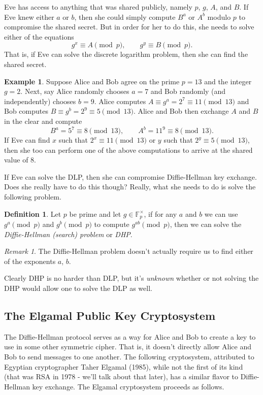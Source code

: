 \documentclass[12pt]{article}
\theoremstyle{plain}
\theoremstyle{definition}
\newtheorem{definition}[theorem]{Definition}
\newtheorem{example}[theorem]{Example}
\theoremstyle{remark}
\newtheorem{remark}[theorem]{Remark}
\newcommand{\F}{\mathbb{F}}
\begin{document}
Eve has access to anything that was shared publicly, namely $p$, $g$, $A$, and $B$.
If Eve knew either $a$ or $b$, then she could simply compute $B^a$ or $A^b$ modulo $p$ to compromise the shared secret.
But in order for her to do this, she needs to solve either of the equations
\[
    g^x \equiv A\pmod p,\qquad g^y\equiv B\pmod p.
\]
That is, if Eve can solve the discrete logarithm problem, then she can find the shared secret.

\begin{example}
    Suppose Alice and Bob agree on the prime $p=13$ and the integer $g = 2$.
    Next, say Alice randomly chooses $a=7$ and Bob randomly (and independently) chooses $b = 9$.
    Alice computes $A\equiv g^a = 2^7 \equiv 11\pmod{13}$ and Bob computes $B\equiv g^b = 2^9 \equiv 5\pmod {13}$.
    Alice and Bob then exchange $A$ and $B$ in the clear and compute
    \[
        B^a = 5^7\equiv 8\pmod {13},\qquad A^b = 11^9\equiv 8\pmod {13}.
    \]
    If Eve can find $x$ such that $2^x\equiv 11\pmod {13}$ or $y$ such that $2^y\equiv 5\pmod{13}$, then she too can perform one of the above computations to arrive at the shared value of 8.
\end{example}

If Eve can solve the DLP, then she can compromise Diffie-Hellman key exchange.
Does she really have to do this though?
Really, what she needs to do is solve the following problem.

\begin{definition}
    Let $p$ be prime and let $g\in \F_p^\times$, if for any $a$ and $b$ we can use $g^a\pmod p$ and $g^b\pmod p$ to compute $g^{ab}\pmod p$, then we can solve the \emph{Diffie-Hellman (search) problem} or \emph{DHP}.
\end{definition}

\begin{remark}
    The Diffie-Hellman problem doesn't actually require us to find either of the exponents $a$, $b$.
\end{remark}
Clearly DHP is no harder than DLP, but it's \emph{unknown} whether or not solving the DHP would allow one to solve the DLP as well.










\subsection{The Elgamal Public Key Cryptosystem}
The Diffie-Hellman protocol serves as a way for Alice and Bob to create a key to use in some other symmetric cipher.
That is, it doesn't directly allow Alice and Bob to send messages to one another.
The following cryptosystem, attributed to Egyptian cryptographer Taher Elgamal (1985), while not the first of its kind (that was RSA in 1978 - we'll talk about that later), has a similar flavor to Diffie-Hellman key exchange.
The Elgamal cryptosystem proceeds as follows.
\end{document}

